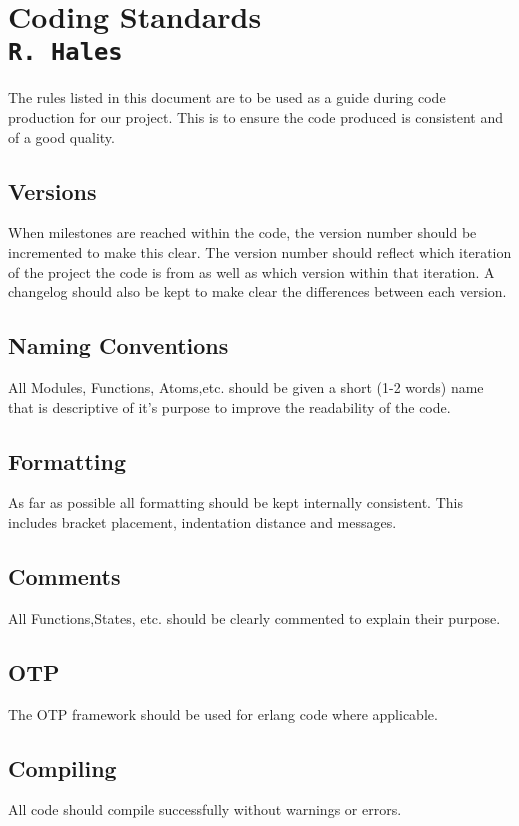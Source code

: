 \section{Coding Standards\\{\small\tt R.~Hales}}
The rules listed in this document are to be used as a guide during code production for our project. This is to ensure the code produced is consistent and of a good quality.

\subsection{Versions}
When milestones are reached within the code, the version number should be incremented to make this clear. The version number should reflect which iteration of the project the code is from as well as which version within that iteration. A changelog should also be kept to make clear the differences between each version.
\subsection{Naming Conventions}
All Modules, Functions, Atoms,etc. should be given a short (1-2 words) name that is descriptive of it's purpose to improve the readability of the code.
\subsection{Formatting}
As far as possible all formatting should be kept internally consistent. This includes bracket placement, indentation distance and messages.
\subsection{Comments}
All Functions,States, etc. should be clearly commented to explain their purpose.
\subsection{OTP}
The OTP framework should be used for erlang code where applicable.
\subsection{Compiling}
All code should compile successfully without warnings or errors.
\clearpage
\endinput
